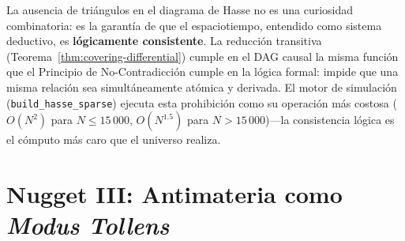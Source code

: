 \documentclass[11pt, a4paper, openany]{book}
\begin{document}
\begin{result}[title={La Geometr\'ia del Espaciotiempo Obedece la
L\'ogica Cl\'asica}]
\label{res:stone-non-contradiction}
La ausencia de tri\'angulos en el diagrama de Hasse no es una
curiosidad combinatoria: es la garant\'ia de que el espaciotiempo,
entendido como sistema deductivo, es \textbf{l\'ogicamente
consistente}. La reducci\'on transitiva
(Teorema~\ref{thm:covering-differential}) cumple en el DAG causal la
misma funci\'on que el Principio de No-Contradicci\'on cumple en la
l\'ogica formal: impide que una misma relaci\'on sea
simult\'aneamente at\'omica y derivada. El motor de simulaci\'on
(\texttt{build\_hasse\_sparse}) ejecuta esta prohibici\'on como su
operaci\'on m\'as costosa ($O(N^2)$ para $N \leq 15\,000$,
$O(N^{1.5})$ para $N > 15\,000$)---la consistencia l\'ogica es el
c\'omputo m\'as caro que el universo realiza.
\end{result}

\section{Nugget III: Antimateria como \emph{Modus Tollens}}
\end{document}
